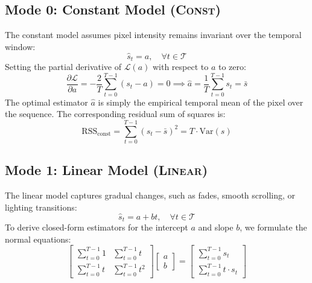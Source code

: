 \subsection{Mode 0: Constant Model (\textsc{Const})}
The constant model assumes pixel intensity remains invariant over the temporal window:
\begin{equation}
    \hat{s}_t = a, \quad \forall t \in \mathcal{T}
\end{equation}
Setting the partial derivative of $\mathcal{L}(a)$ with respect to $a$ to zero:
\begin{equation}
    \frac{\partial \mathcal{L}}{\partial a} = -\frac{2}{T} \sum_{t=0}^{T-1} (s_t - a) = 0 \implies \hat{a} = \frac{1}{T} \sum_{t=0}^{T-1} s_t = \bar{s}
\end{equation}
The optimal estimator $\hat{a}$ is simply the empirical temporal mean of the pixel over the sequence. The corresponding residual sum of squares is:
\begin{equation}
    \text{RSS}_{\text{const}} = \sum_{t=0}^{T-1} (s_t - \bar{s})^2 = T \cdot \text{Var}(s)
\end{equation}

\subsection{Mode 1: Linear Model (\textsc{Linear})}
The linear model captures gradual changes, such as fades, smooth scrolling, or lighting transitions:
\begin{equation}
    \hat{s}_t = a + b t, \quad \forall t \in \mathcal{T}
\end{equation}
To derive closed-form estimators for the intercept $a$ and slope $b$, we formulate the normal equations:
\begin{equation}
    \begin{bmatrix}
        \sum_{t=0}^{T-1} 1 & \sum_{t=0}^{T-1} t \\
        \sum_{t=0}^{T-1} t & \sum_{t=0}^{T-1} t^2
    \end{bmatrix}
    \begin{bmatrix}
        a \\
        b
    \end{bmatrix}
    =
    \begin{bmatrix}
        \sum_{t=0}^{T-1} s_t \\
        \sum_{t=0}^{T-1} t \cdot s_t
    \end{bmatrix}
\end{equation}

